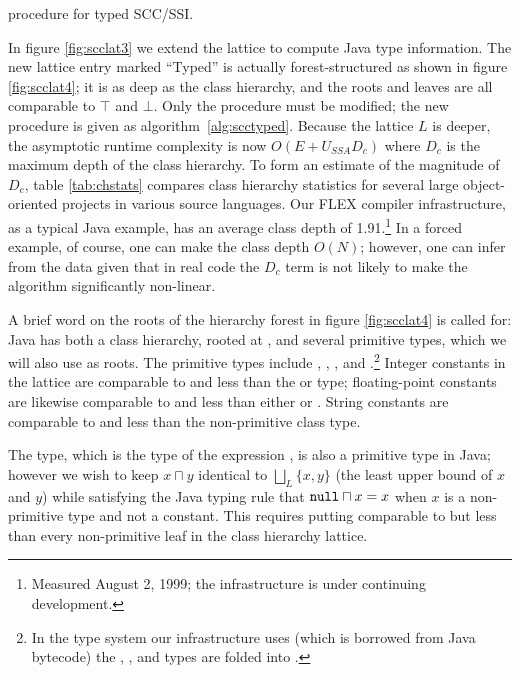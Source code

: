 \documentclass[12pt,titlepage,twoside]{article}
\newcommand{\meet}{\ensuremath{\sqcap}}
\begin{document}
\begin{myalgorithm}\small

\caption{ procedure for typed SCC/SSI.}
\label{alg:scctyped}
\end{myalgorithm}
In figure \ref{fig:scclat3} we extend the lattice to compute Java type
information.  The new lattice entry marked ``Typed'' is actually
forest-structured as shown in figure \ref{fig:scclat4}; it is as deep
as the class hierarchy, and the roots and leaves are all comparable to
$\top$ and $\bot$.  Only the  procedure must be modified;
the new procedure is given as algorithm~\ref{alg:scctyped}.
Because the lattice $L$ is
deeper, the asymptotic runtime complexity is now $O(E+U_{SSA}D_c)$
where $D_c$ is the maximum depth of the class hierarchy.  
To form an estimate of the magnitude of $D_c$, table \ref{tab:chstats}
compares class hierarchy statistics for several large
object-oriented projects in various source languages. Our FLEX
compiler infrastructure, as a typical Java example, has an average
class depth of 1.91.\footnote{Measured August 2, 1999; the
infrastructure is under continuing development.}
In a forced example, of course, one can make the class depth $O(N)$;
however, one can infer from the data given that in real code the $D_c$
term is not likely to make the algorithm significantly non-linear.

A brief word on the roots of the hierarchy forest in figure
\ref{fig:scclat4} is called for: Java has both a class hierarchy,
rooted at , and several primitive types, which
we will also use as roots.  The primitive types include
, , , and
.\footnote{In the type system our infrastructure uses
(which is borrowed from Java bytecode) the ,
,  and  types are folded into
.}  Integer constants in the lattice are comparable to and
less than the  or  type; floating-point constants
are likewise comparable to and less than either  or
.  String constants are comparable to and less than the
 non-primitive class type.

The  type, which is the type of the expression ,
is also a primitive type in Java; however we wish to keep $x \meet y$
identical to $\bigsqcup_L\{x, y\}$ (the least upper bound of $x$ and
$y$) while satisfying the Java typing rule that $\code{null} \meet x = x$
when $x$ is a non-primitive type and not a constant.  This requires
putting  comparable to but less than every non-primitive
leaf in the class hierarchy lattice.
\end{document}
